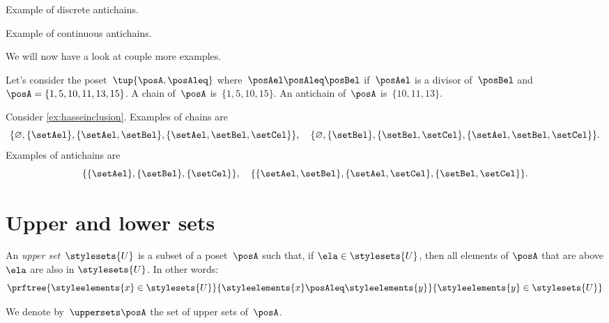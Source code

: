 \begin{marginfigure}
  \begin{center}
  \end{center}
  \caption{Example of discrete antichains.}
  \label{fig:antichain}
\end{marginfigure}

\begin{marginfigure}
  \begin{center}
  \end{center}
  \caption{Example of continuous antichains.}
  \label{fig:antichain_2}
\end{marginfigure}

We will now have a look at couple more examples.
\begin{example}
  Let's consider the poset~$\tup{\posA,\posAleq}$ where~$\posAel \posAleq \posBel$ if~$\posAel$ is a divisor of~$\posBel$ and~$\posA=\{1,5,10,11,13,15\}$.
  A chain of~$\posA$ is~$\{1,5,10,15\}$. An antichain of~$\posA$ is~$\{10,11,13\}$.
\end{example}

\begin{example}
  Consider \cref{ex:hasseinclusion}. Examples of chains are
  \begin{equation}
    \{\varnothing,\{\setAel\},\{\setAel,\setBel\},\{\setAel,\setBel,\setCel\}\}, \quad  \{\varnothing,\{\setBel\},\{\setBel,\setCel\},\{\setAel,\setBel,\setCel\}\}.
  \end{equation}
  Examples of antichains are
  \begin{equation}
    \{\{\setAel\},\{\setBel\},\{\setCel\}\}, \quad \{ \{\setAel,\setBel\},\{\setAel,\setCel\}, \{\setBel,\setCel\}\}.
  \end{equation}
\end{example}

\section{Upper and lower sets}
\label{sec:UpperLowerSets}


\begin{definition}
  \label{def:upperset}
  An \emph{upper set}~$\stylesets{U}$ is a subset of a poset~$\posA$ such
  that, if $\ela \in \stylesets{U}$, then all elements of $\posA$ that are above $\ela$ are also in $\stylesets{U}$. In other words:
  \begin{equation}
    \prftree{\styleelements{x}\in \stylesets{U}}{\styleelements{x}\posAleq \styleelements{y}}{\styleelements{y}\in \stylesets{U}}
  \end{equation}
\end{definition}
We denote by~$\uppersets \posA$ the set of upper sets of~$\posA$.

